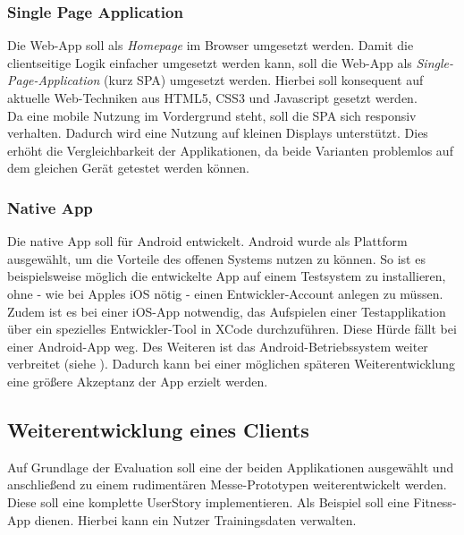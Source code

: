 \subsubsection*{Single Page Application}
\label{ssec:aufgabenstellung:spa}
Die Web-App soll als \textit{Homepage} im Browser umgesetzt werden. Damit die clientseitige Logik einfacher umgesetzt werden kann, soll die Web-App als \textit{Single-Page-Application} (kurz \ac{SPA}) umgesetzt werden. Hierbei soll konsequent auf aktuelle Web-Techniken aus HTML5, CSS3 und Javascript gesetzt werden. \\
Da eine mobile Nutzung im Vordergrund steht, soll die SPA sich \gls{responsiv} verhalten. Dadurch wird eine Nutzung auf kleinen Displays unterstützt. Dies erhöht die Vergleichbarkeit der Applikationen, da beide Varianten problemlos auf dem gleichen Gerät getestet werden können.
\subsubsection*{Native App}
\label{ssec:aufgabenstellung:nat-app}
Die native App soll für Android entwickelt. Android wurde als Plattform ausgewählt, um die Vorteile des offenen Systems nutzen zu können. So ist es beispielsweise möglich die entwickelte App auf einem Testsystem zu installieren, ohne - wie bei Apples iOS nötig - einen Entwickler-Account anlegen zu müssen.\\ 
Zudem ist es bei einer iOS-App notwendig, das Aufspielen einer Testapplikation über ein spezielles Entwickler-Tool in XCode durchzuführen. Diese Hürde fällt bei einer Android-App weg. Des Weiteren ist das Android-Betriebssystem weiter verbreitet (siehe \cite{Statista-SmartphoneVerteilung}). Dadurch kann bei einer möglichen späteren Weiterentwicklung eine größere Akzeptanz der App erzielt werden.
\subsection{Weiterentwicklung eines Clients}
\label{ssec:umsetzung-client-entwicklung}
Auf Grundlage der Evaluation soll eine der beiden Applikationen ausgewählt und anschließend zu einem rudimentären Messe-Prototypen weiterentwickelt werden. Diese soll eine komplette \gls{UserStory} implementieren. Als Beispiel soll eine Fitness-App dienen. Hierbei kann ein Nutzer Trainingsdaten verwalten. 

